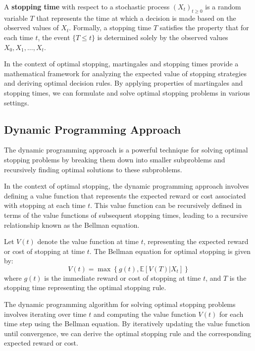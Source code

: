\documentclass[12pt]{book} %
\begin{document}
A \textbf{stopping time} with respect to a stochastic process \( (X_t)_{t \geq 0} \) is a random variable \( T \) that represents the time at which a decision is made based on the observed values of \( X_t \). Formally, a stopping time \( T \) satisfies the property that for each time \( t \), the event \( \{ T \leq t \} \) is determined solely by the observed values \( X_0, X_1, \ldots, X_t \).

In the context of optimal stopping, martingales and stopping times provide a mathematical framework for analyzing the expected value of stopping strategies and deriving optimal decision rules. By applying properties of martingales and stopping times, we can formulate and solve optimal stopping problems in various settings.

\subsection{Dynamic Programming Approach}

The dynamic programming approach is a powerful technique for solving optimal stopping problems by breaking them down into smaller subproblems and recursively finding optimal solutions to these subproblems.

In the context of optimal stopping, the dynamic programming approach involves defining a value function that represents the expected reward or cost associated with stopping at each time \( t \). This value function can be recursively defined in terms of the value functions of subsequent stopping times, leading to a recursive relationship known as the Bellman equation.

Let \( V(t) \) denote the value function at time \( t \), representing the expected reward or cost of stopping at time \( t \). The Bellman equation for optimal stopping is given by:
\[
V(t) = \max \left\{ g(t), \mathbb{E}[V(T) | X_t] \right\}
\]
where \( g(t) \) is the immediate reward or cost of stopping at time \( t \), and \( T \) is the stopping time representing the optimal stopping rule.

The dynamic programming algorithm for solving optimal stopping problems involves iterating over time \( t \) and computing the value function \( V(t) \) for each time step using the Bellman equation. By iteratively updating the value function until convergence, we can derive the optimal stopping rule and the corresponding expected reward or cost.
\end{document}
